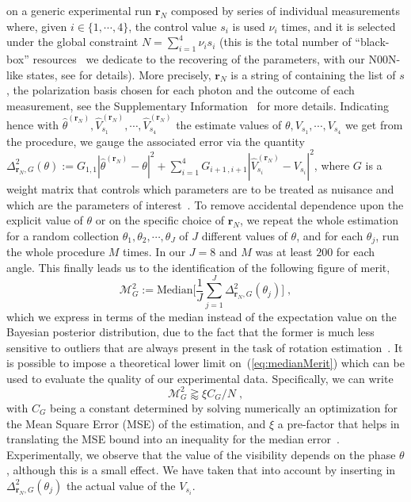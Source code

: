 \documentclass[aps,pra,twocolumn,notitlepage,superscriptaddress]{revtex4-1}
\begin{document}
on a generic experimental run ${{\mathbf r}_N}$ composed by series of individual measurements where, given $i\in \{1,\cdots, 4\}$, the control value $s_i$ is used $\nu_i$ times, and it is selected under the global constraint $N =\sum_{i=1}^4 \nu_i s_i$ (this is the total number of ``black-box'' resources~\cite{PhysRevLett.96.010401} we dedicate to the recovering of the parameters, with our N00N-like states, see \cite{SI} for details). More precisely, ${{\mathbf r}_N}$ is a string of containing the list of $s$, the polarization basis chosen for each photon and the outcome of each measurement, see the Supplementary Information~\cite{SI} for more details. Indicating hence with $\hat{\theta}^{({\mathbf r}_N)}, \hat{V}^{({\mathbf r}_N)}_{s_1}, \cdots, \hat{V}^{({\mathbf r}_N)}_{s_4}$ the estimate values of ${\theta}, {V}_{s_1}, \cdots, {V}_{s_4}$ we get from the procedure, we gauge the associated error via the quantity $\Delta^{2}_{{\mathbf r}_N,G}(\theta):=G_{1,1}|\hat{\theta}^{({\mathbf r}_N)}-\theta|^2 + \sum_{i=1}^4 G_{i+1\, , i+1} |\hat{V}^{({\mathbf r}_N)}_{s_i}-V_{s_i}|^2$, where $G$ is a weight matrix that controls which parameters are to be treated as nuisance and which are the parameters of interest~\cite{goldberg2020multiphase}. To remove accidental dependence upon the explicit value of $\theta$ or on the specific choice of ${{\mathbf r}_N}$, we repeat the whole estimation for a random collection $\theta_1, \theta_2,\cdots,\theta_J$ of $J$ different values of $\theta$, and for each $\theta_j$, run the whole procedure $M$ times. In our $J=8$ and $M$ was at least $200$ for each angle. This finally leads us to the identification of the following figure of merit,
%
\begin{equation}
\mathcal{M}^2_G := \text{Median} \Big[ \frac{1}{J}
	\sum_{j=1}^J \Delta^{2}_{{\mathbf r}_N,G}(\theta_j) \Big] \; ,
	\label{eq:medianMerit}
\end{equation}
%
which we express in terms of the median instead of the expectation value on the Bayesian posterior distribution, due to the fact that the former is much less sensitive to outliers that are always present in the task of rotation estimation~\cite{cimini2021non}. It is possible to impose a theoretical lower limit on~(\ref{eq:medianMerit}) which can be used to evaluate the quality of our experimental data. Specifically, we can write
%
\begin{equation}
	\mathcal{M}^2_G \gtrapprox \xi {C_G}/{N} \; ,
	\label{eq:boundMSE}
\end{equation}
%
with $C_G$ being a constant determined by solving numerically an optimization for the Mean Square Error (MSE) of the estimation, and $\xi$ a pre-factor that helps in translating the MSE bound into an inequality for the median error~\cite{SI}. Experimentally, we observe that the value of the visibility depends on the phase $\theta$, although this is a small effect. We have taken that into account by inserting in $\Delta_{{\boldsymbol{r}_N}, G}^2 (\theta_j)$ the actual value of the $V_{s_i}$.
\end{document}
